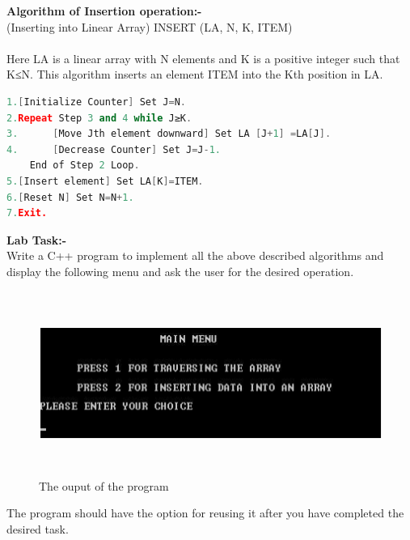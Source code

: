 \documentclass[11pt]{article}            %
\begin{document}
\textbf{Algorithm of Insertion operation:-}\\
(Inserting into Linear Array) INSERT (LA, N, K, ITEM)\\~\\
Here LA is a linear array with N elements and K is a positive integer such that K≤N. This algorithm
inserts an element ITEM into the Kth position in LA.\\


\begin{lstlisting}[language=C++]
1.[Initialize Counter] Set J=N.
2.Repeat Step 3 and 4 while J≥K.
3.		[Move Jth element downward] Set LA [J+1] =LA[J].
4.		[Decrease Counter] Set J=J-1.
	End of Step 2 Loop.
5.[Insert element] Set LA[K]=ITEM.
6.[Reset N] Set N=N+1.
7.Exit.
\end{lstlisting}

\textbf{Lab Task:-}\\
Write a C++ program to implement all the above described algorithms and display the following
menu and ask the user for the desired operation.\\
\begin{figure}[H]
\centering
  \includegraphics[width=12cm,height=6cm,keepaspectratio]{1.png}
\caption{The ouput of the program}
\label{Figure:1}    
\end{figure}
The program should have the option for reusing it after you have completed the desired task.\\
\end{document}
